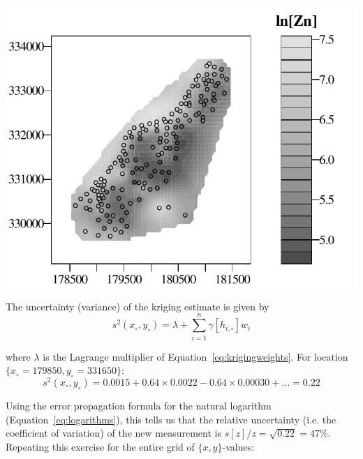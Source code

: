 \noindent\begin{minipage}[t][][b]{.6\textwidth}
\includegraphics[width=\textwidth]{../figures/meusecontour.pdf}\medskip
\end{minipage}
\begin{minipage}[t][][t]{.39\textwidth}
  \label{fig:meusecontour}
\end{minipage}

The uncertainty (variance) of the kriging estimate is given by
\begin{equation}
  s^2(x_\circ,y_\circ) = \lambda + \sum\limits_{i=1}^n \gamma[h_{i,\circ}] w_i
  \label{eq:kriginvar}
\end{equation}

\noindent where $\lambda$ is the Lagrange multiplier of
Equation~\ref{eq:krigingweights}. For location
$\{x_\circ=179850,y_\circ=331650\}$:
\[
s^2(x_\circ,y_\circ) = 0.0015 + 0.64 \times 0.0022 - 0.64 \times
0.00030 + \ldots = 0.22
\]

Using the error propagation formula for the natural logarithm
(Equation~\ref{eq:logarithms}), this tells us that the relative
uncertainty (i.e. the coefficient of variation) of the new measurement
is $s[z]/z=\sqrt{0.22}=47$\%. Repeating this exercise for the entire
grid of $\{x,y\}$-values:

